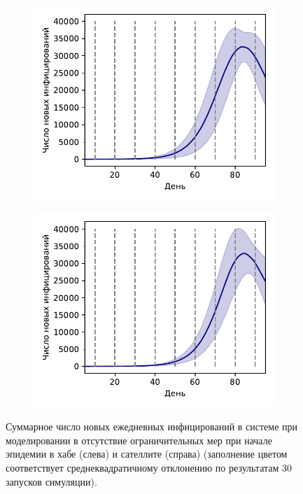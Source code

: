 \documentclass[a4paper,12pt]{article} %
\begin{document}
\begin{figure}[H]
    \centering
    \begin{subfigure}{0.45\linewidth}
        \centering
        \includegraphics[width=\linewidth]{images/satellites_epid0.pdf}
    \end{subfigure}
    \hfill
    \begin{subfigure}{0.45\linewidth}
        \centering
        \includegraphics[width=\linewidth]{images/satellites_epid1.pdf}
    \end{subfigure}
    \caption{Суммарное число новых ежедневных инфицирований в системе при моделировании в отсутствие ограничительных мер при начале эпидемии в хабе (слева) и сателлите (справа) (заполнение цветом соответствует среднеквадратичному отклонению по результатам 30 запусков симуляции).}
    \label{pic:satellites_epid0}
\end{figure}
\end{document}
